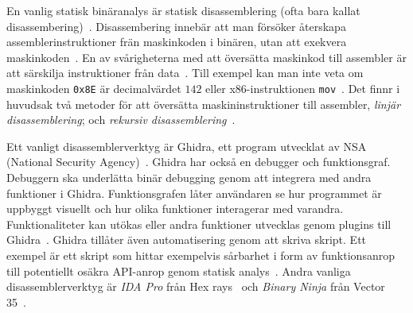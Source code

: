 En vanlig statisk binäranalys är statisk disassemblering (ofta bara kallat
disassembering)~\cite{andriesse2018}. Disassembering innebär att man försöker
återskapa assemblerinstruktioner frän maskinkoden i binären, utan att exekvera
maskinkoden~\cite{andriesse2018}. En av svårigheterna med att översätta
maskinkod till assembler är att särskilja instruktioner från
data~\cite{andriesse2018}.  Till exempel kan man inte veta om maskinkoden
\verb|0x8E| är decimalvärdet $142$ eller x86-instruktionen
\verb|mov|~\cite{andriesse2018}. Det finnr i huvudsak två metoder för att
översätta maskininstruktioner till assembler, \emph{linjär disassemblering}; och
\emph{rekursiv disassemblering}~\cite{andriesse2018}.

Ett vanligt disassemblerverktyg är Ghidra, ett program utvecklat av NSA
(National Security Agency)~\cite{ghidra_website}. Ghidra har också en debugger
och funktionsgraf. Debuggern ska underlätta binär debugging genom att
integrera med andra funktioner i Ghidra. Funktionsgrafen låter användaren se
hur programmet är uppbyggt visuellt och hur olika funktioner interagerar med
varandra. Funktionaliteter kan utökas eller andra funktioner utvecklas genom
plugins till Ghidra~\cite{ghidra_use_cases}. Ghidra tillåter även automatisering
genom att skriva skript. Ett exempel är ett skript som hittar exempelvis
sårbarhet i form av funktionsanrop till potentiellt osäkra API-anrop genom
statisk analys~\cite{ghidra_script}. Andra vanliga disassemblerverktyg är
\emph{IDA Pro} från Hex rays~\cite{hex_rays} och \emph{Binary Ninja} från Vector
35~\cite{binary_ninja}.
